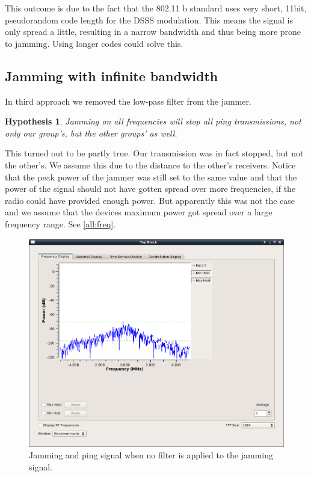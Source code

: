 \documentclass[12pt,a4paper]{article}
\newtheorem{hypo}{Hypothesis}
\begin{document}
	This outcome is due to the fact that the 802.11 b standard uses very short, 11bit, pseudorandom code length for the DSSS modulation. This means the signal is only spread a little, resulting in a narrow bandwidth and thus being more prone to jamming.
	Using longer codes could solve this. 

\subsection{Jamming with infinite bandwidth}
	In third approach we removed the low-pass filter from the jammer.
	\begin{hypo}
		Jamming on all frequencies will stop all ping transmissions, not only our group's, but the other groups' as well.
	\end{hypo}
	
	This turned out to be partly true.
	Our transmission was in fact stopped, but not the other's.
	We assume this due to the distance to the other's receivers.
	Notice that the peak power of the jammer was still set to the same value and that the power of the signal should not have gotten spread over more frequencies, if the radio could have provided enough power. 
	But apparently this was not the case and we assume that the devices maximum power got spread over a large frequency range.
	See \autoref{all:freq}.
	
	\begin{figure}
		\includegraphics[width=\textwidth]{images/mon_jamallfrequ_ping.png}
		\caption{Jamming and ping signal when no filter is applied to the jamming signal.}
		\label{all:freq}
	\end{figure}
	
\end{document}
